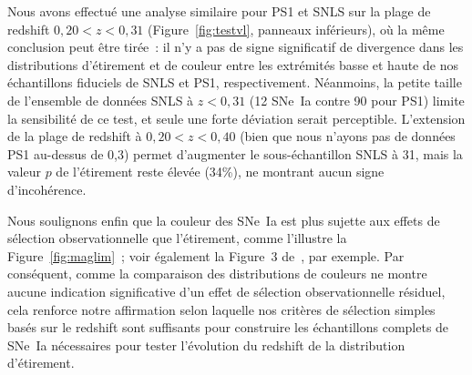 \documentclass[../main/main.tex]{subfiles}
\begin{document}
Nous avons effectué une analyse similaire pour PS1 et SNLS sur la plage de
redshift $0,20 < z < 0,31$ (Figure~\ref{fig:testvl}, panneaux inférieurs), où la
même conclusion peut être tirée~: il n'y a pas de signe significatif de
divergence dans les distributions d'étirement et de couleur entre les extrémités
basse et haute de nos échantillons fiduciels de SNLS et PS1, respectivement.
Néanmoins, la petite taille de l'ensemble de données SNLS à $z < 0,31$ (12
SNe~Ia contre 90 pour PS1) limite la sensibilité de ce test, et seule une forte
déviation serait perceptible. L'extension de la plage de redshift à $0,20 < z <
0,40$ (bien que nous n'ayons pas de données PS1 au-dessus de 0,3) permet
d'augmenter le sous-échantillon SNLS à 31, mais la valeur $p$ de l'étirement
reste élevée (34\%), ne montrant aucun signe d'incohérence.

Nous soulignons enfin que la couleur des SNe~Ia est plus sujette aux effets de
sélection observationnelle que l'étirement, comme l'illustre la
Figure~\ref{fig:maglim}~; voir également la Figure~3 de~\cite{kessler2017}, par
exemple. Par conséquent, comme la comparaison des distributions de couleurs ne
montre aucune indication significative d'un effet de sélection observationnelle
résiduel, cela renforce notre affirmation selon laquelle nos critères de
sélection simples basés sur le redshift sont suffisants pour construire les
échantillons complets de SNe~Ia nécessaires pour tester l'évolution du redshift
de la distribution d'étirement.

\newpage

\minilof
\minilot

% 
% 
\end{document}
